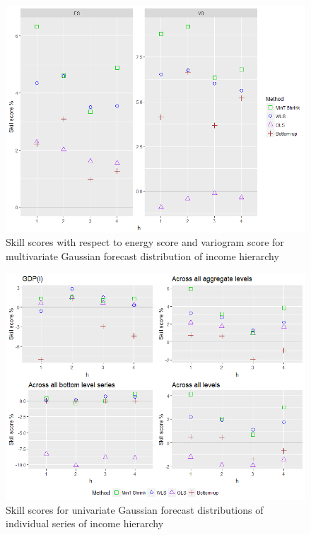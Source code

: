\documentclass[graybox]{svmult}
\begin{document}
\begin{figure}[H]
	\centering
	\small
	\includegraphics[scale=0.50]{Figs/Results/INC-ProbNonParaF-MultivS_ES_VS.png}
	\caption{Skill scores with respect to energy score and variogram score for multivariate Gaussian forecast distribution of income hierarchy}\label{Inc_ProbNonParF_ES_VS}
\end{figure}

\begin{figure}[H]
	\centering
	\small
	\includegraphics[scale=0.50]{Figs/Results/INC-ProbNonParaF-UnivS_CRPS.png}
	\caption{Skill scores for univariate Gaussian forecast distributions of individual series of income hierarchy}\label{Inc_ProbNonParF_UnivS}
\end{figure}
\end{document}
